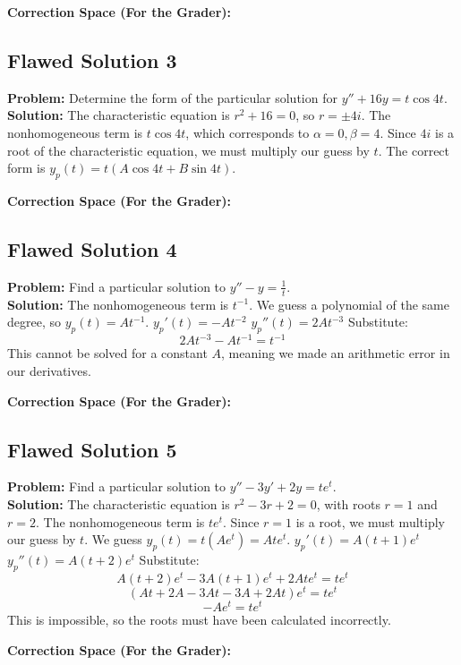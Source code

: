 \documentclass[12pt]{article}
\begin{document}
\textbf{Correction Space (For the Grader):}
\vspace{2cm}

\subsection{Flawed Solution 3}
\textbf{Problem:} Determine the form of the particular solution for $y'' + 16y = t \cos 4t$. \\
\textbf{Solution:}
The characteristic equation is $r^2 + 16 = 0$, so $r = \pm 4i$.
The nonhomogeneous term is $t \cos 4t$, which corresponds to $\alpha = 0, \beta = 4$.
Since $4i$ is a root of the characteristic equation, we must multiply our guess by $t$.
The correct form is $y_p(t) = t (A \cos 4t + B \sin 4t)$.

\textbf{Correction Space (For the Grader):}
\vspace{2cm}

\subsection{Flawed Solution 4}
\textbf{Problem:} Find a particular solution to $y'' - y = \frac{1}{t}$. \\
\textbf{Solution:}
The nonhomogeneous term is $t^{-1}$. We guess a polynomial of the same degree, so $y_p(t) = A t^{-1}$.
$y_p'(t) = -A t^{-2}$
$y_p''(t) = 2A t^{-3}$
Substitute:
\[ 2A t^{-3} - A t^{-1} = t^{-1} \]
This cannot be solved for a constant $A$, meaning we made an arithmetic error in our derivatives.

\textbf{Correction Space (For the Grader):}
\vspace{2cm}

\subsection{Flawed Solution 5}
\textbf{Problem:} Find a particular solution to $y'' - 3y' + 2y = t e^{t}$. \\
\textbf{Solution:}
The characteristic equation is $r^2 - 3r + 2 = 0$, with roots $r=1$ and $r=2$.
The nonhomogeneous term is $t e^t$. Since $r=1$ is a root, we must multiply our guess by $t$.
We guess $y_p(t) = t (A e^t) = A t e^t$.
$y_p'(t) = A(t+1)e^t$
$y_p''(t) = A(t+2)e^t$
Substitute:
\[ A(t+2)e^t - 3A(t+1)e^t + 2A t e^t = t e^t \]
\[ (At + 2A - 3At - 3A + 2At)e^t = t e^t \]
\[ -A e^t = t e^t \]
This is impossible, so the roots must have been calculated incorrectly.

\textbf{Correction Space (For the Grader):}
\vspace{2cm}
\end{document}

